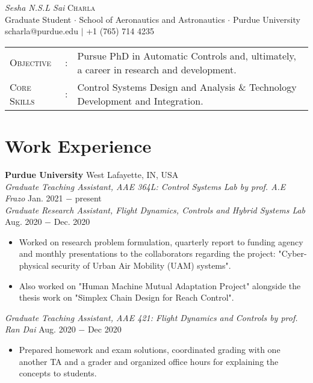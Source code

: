 \documentclass[letterpaper,10pt]{article}
\begin{document}
\begin{center}
\thispagestyle{empty}
\huge{\textit{Sesha N.S.L Sai} \textsc{Charla}}\\
\small Graduate Student $\cdot$ School of Aeronautics and Astronautics $\cdot$ Purdue University\\
\small scharla@purdue.edu $\mid$ +1 (765) 714 4235   \\
\end{center}



\begin{tabular}{l c l}
	{\large{\textsc{Objective}}}&:& Pursue PhD in Automatic Controls and, ultimately, a career in research and development.\\
	{\large{\textsc{Core Skills}}}&:& Control Systems Design and Analysis \& Technology Development and Integration. %
\end{tabular}


\section{Work Experience} 
\noindent \textbf{Purdue University} \hfill West Lafayette, IN, USA \\
\noindent \textit{Graduate Teaching Assistant, AAE 364L: Control Systems Lab by prof. A.E Frazo} \hfill Jan. 2021 $-$ present\\
\noindent \textit{Graduate Research Assistant, Flight Dynamics, Controls and Hybrid Systems Lab} \hfill Aug. 2020 $-$ Dec. 2020
\begin{itemize}[noitemsep,nolistsep,leftmargin=0.25in,label={--}]
    \item Worked on research problem formulation, quarterly report to funding agency and monthly presentations to the collaborators regarding the project: "Cyber-physical security of Urban Air Mobility (UAM) systems".
    \item Also worked on "Human Machine Mutual Adaptation Project" alongside the thesis work on "Simplex Chain Design for Reach Control".
\end{itemize}

\vspace{3pt}
\noindent \textit{Graduate Teaching Assistant, AAE 421: Flight Dynamics and Controls by prof. Ran Dai} \hfill Aug. 2020 $-$ Dec 2020
\begin{itemize}[noitemsep,nolistsep,leftmargin=0.25in,label={--}]
    \item Prepared homework and exam solutions, coordinated grading with one another TA and a grader and organized office hours for explaining the concepts to students.
\end{itemize}
\end{document}
